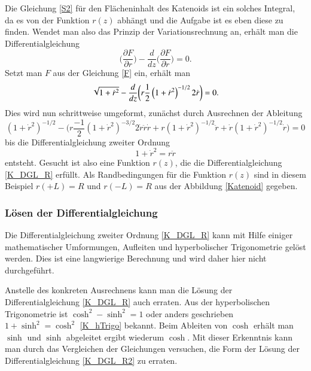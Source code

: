 \begin{refsection}
Die Gleichung \eqref{S2} für den Flächeninhalt des Katenoids ist ein solches Integral, da es von der Funktion $r(z)$ abhängt und die Aufgabe ist es eben diese zu finden. Wendet man also das Prinzip der Variationsrechnung an, erhält man die Differentialgleichung
\begin{equation} \label{K_DGL1}
\bigg(\frac{\partial F}{\partial r}\bigg)- \frac{d}{dz} \bigg(\frac{\partial F}{\partial \dot{r}}\bigg)=0 .
\end{equation}
Setzt man $F$ aus der Gleichung \eqref{F} ein, erhält man
\begin{equation} \label{K_DGL_H}
\sqrt{1+{\dot {r}}^2}-\frac{ d }{ dz } \bigg( r \frac{ 1 }{2  }\left( {1+{\dot {r}}^2}  \right)^{-1/2} 2 \dot {r}\bigg)=0 .
\\
\end{equation}
Dies wird nun schrittweise umgeformt, zunächst durch Ausrechnen der Ableitung
\begin{equation} \label{K_DGL_H2}
(1+{\dot {r}}^2)^{-1/2}
-
\bigg(r \frac{ -1 }{2  } ({1+{\dot {r}}^2}  )^{-3/2} 2 \dot{r} \ddot{r}  \dot{r}
+
r ({1+{\dot {r}}^2} )^{-1/2} \ddot{r}
+
\dot{r} ({1+{\dot {r}}^2} )^{-1/2} \dot{r}\bigg)=0
\end{equation}
bis die Differentialgleichung zweiter Ordnung  
\begin{equation} \label{K_DGL_R}
1+{\dot {r}}^2=r  \ddot{r}
\end{equation}
entsteht. 
Gesucht ist also eine Funktion $r(z)$, die die Differentialgleichung \eqref{K_DGL_R} erfüllt. Als Randbedingungen für die Funktion $r(z)$ sind in diesem Beispiel $r(+L)=R$ und $r(-L)=R$ aus der Abbildung \ref{Katenoid} gegeben.

\subsubsection{Lösen der Differentialgleichung}
Die Differentialgleichung zweiter Ordnung \eqref{K_DGL_R} kann mit Hilfe einiger mathematischer Umformungen, Aufleiten und hyperbolischer Trigonometrie gelöst werden. 
Dies ist eine langwierige Berechnung und wird daher hier nicht durchgeführt.

Anstelle des konkreten Ausrechnens kann man die Lösung der Differentialgleichung \eqref{K_DGL_R} auch erraten. 
Aus der hyperbolischen Trigonometrie ist $\cosh^2-\sinh^2=1$ oder anders geschrieben $1+\sinh^2=\cosh^2$ \eqref{K_hTrigo} bekannt. 
Beim Ableiten von $\cosh$ erhält man $\sinh$ und $\sinh$ abgeleitet ergibt wiederum $\cosh$. 
Mit dieser Erkenntnis kann man durch das Vergleichen der Gleichungen versuchen, die Form der Lösung der Differentialgleichung \eqref{K_DGL_R2} zu erraten. 


\end{refsection}
